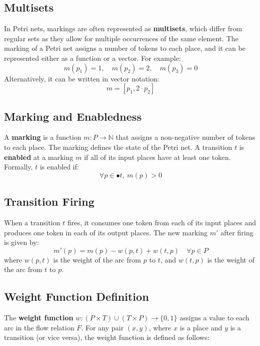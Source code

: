     \subsection{Multisets}
    
    In Petri nets, markings are often represented as \textbf{multisets}, which differ from regular sets as they allow for multiple occurrences of the same element. The marking of a Petri net assigns a number of tokens to each place, and it can be represented either as a function or a vector. For example:
    \[
    m(p_1) = 1, \quad m(p_2) = 2, \quad m(p_3) = 0
    \]
    Alternatively, it can be written in vector notation:
    \[
    m = [p_1, 2 \cdot p_2]
    \]
    
    \subsection{Marking and Enabledness}
    
    A \textbf{marking} is a function \(m: P \to \mathbb{N}\) that assigns a non-negative number of tokens to each place. The marking defines the state of the Petri net. A transition \(t\) is \textbf{enabled} at a marking \(m\) if all of its input places have at least one token. Formally, \(t\) is enabled if:
    \[
    \forall p \in \bullet t, \ m(p) > 0
    \]
    
    \subsection{Transition Firing}
    
    When a transition \(t\) fires, it consumes one token from each of its input places and produces one token in each of its output places. The new marking \(m'\) after firing is given by:
    \[
    m'(p) = m(p) - w(p,t) + w(t,p) \quad \forall p \in P
    \]
    where \(w(p,t)\) is the weight of the arc from \(p\) to \(t\), and \(w(t,p)\) is the weight of the arc from \(t\) to \(p\).
    
    \subsection{Weight Function Definition}
    
    The \textbf{weight function} \(w: (P \times T) \cup (T \times P) \to \{0, 1\}\) assigns a value to each arc in the flow relation \(F\). For any pair \((x, y)\), where \(x\) is a place and \(y\) is a transition (or vice versa), the weight function is defined as follows:
    
